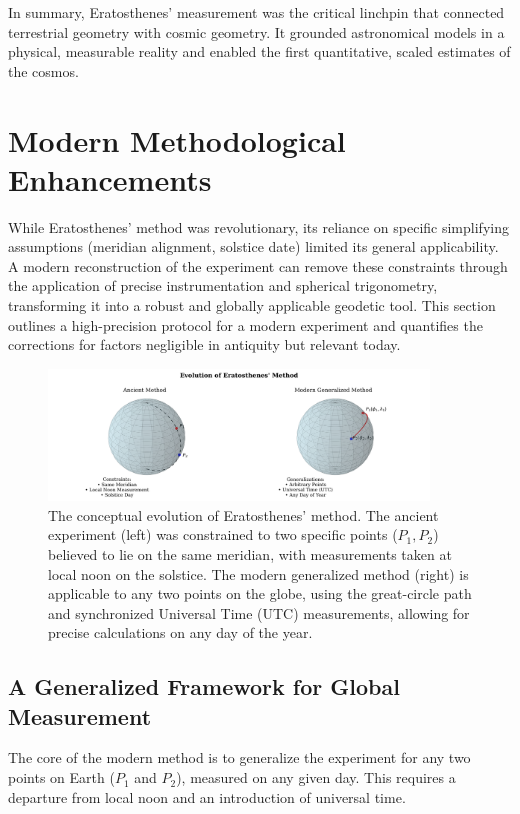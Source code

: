 \documentclass[11pt]{article}
\begin{document}
In summary, Eratosthenes' measurement was the critical linchpin that connected terrestrial geometry with cosmic geometry. It grounded astronomical models in a physical, measurable reality and enabled the first quantitative, scaled estimates of the cosmos.

\section{Modern Methodological Enhancements}

While Eratosthenes’ method was revolutionary, its reliance on specific simplifying assumptions (meridian alignment, solstice date) limited its general applicability. A modern reconstruction of the experiment can remove these constraints through the application of precise instrumentation and spherical trigonometry, transforming it into a robust and globally applicable geodetic tool. This section outlines a high-precision protocol for a modern experiment and quantifies the corrections for factors negligible in antiquity but relevant today.

\begin{figure}[htbp]
    \centering
    \includegraphics[width=0.9\textwidth]{figures/figure_7_ancient_vs_modern.png}
    \caption{
        The conceptual evolution of Eratosthenes' method. The ancient experiment (left) was constrained to two specific points ($P_1, P_2$) believed to lie on the same meridian, with measurements taken at local noon on the solstice. The modern generalized method (right) is applicable to any two points on the globe, using the great-circle path and synchronized Universal Time (UTC) measurements, allowing for precise calculations on any day of the year.
    }
    \label{fig:ancient_vs_modern}
\end{figure}

\subsection{A Generalized Framework for Global Measurement}

The core of the modern method is to generalize the experiment for any two points on Earth ($P_1$ and $P_2$), measured on any given day. This requires a departure from local noon and an introduction of universal time.
\end{document}
